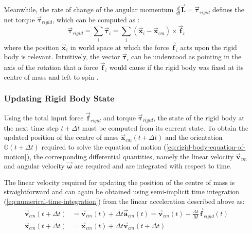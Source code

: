 \documentclass[oneside, a4paper]{book}
\newcommand\vek[1]{\vec{\bm{#1}}}
\newcommand\br[1]{\left(#1\right)}
\begin{document}
    Meanwhile, the rate of change of the angular momentum  $\frac{d}{dt}\vek{L}=\vek{\tau}_{rigid}$ defines the net torque $\vek{\tau}_{rigid}$, which can be computed as \autocite{physically-based-rigids}:
    \begin{equation}\label{eq:rigid-net-torque}
      \vek{\tau}_{rigid} = \sum_i \vek{\tau}_i = \sum_i (\vek{x}_i-\vek{x}_{cm}) \times \vek{f}_i
    \end{equation}
    where the position $\vek{x}_i$ in world space at which the force $\vek{f}_i$ acts upon the rigid body is relevant. Intuitively, the vector $\vek{\tau}_i$ can be understood as pointing in the axis of the rotation that a force $\vek{f}_i$ would cause if the rigid body was fixed at its centre of mass and left to spin \autocite{physically-based-rigids}.
    
    \subsubsection{Updating Rigid Body State}
    Using the total input force $\vek{f}_{rigid}$ and torque $\vek{\tau}_{rigid}$, the state of the rigid body at the next time step $t+\Delta t$ must be computed from its current state. To obtain the updated position of the centre of mass $\vek{x}_{cm}\br{t+\Delta t}$ and the orientation $\mathds{O}\br{t+\Delta t}$ required to solve the equation of motion (\autoref{eq:rigid-body-equation-of-motion}), the corresponding differential quantities, namely the linear velocity $\vek{v}_{cm}$ and angular velocity $\vek{\omega}$ are required and are integrated with respect to time. 

    The linear velocity required for updating the position of the centre of mass is straightforward and can again be obtained using semi-implicit time integration (\autoref{eq:numerical-time-integration}) from the linear acceleration described above as:
    \begin{align}
      \vek{v}_{cm}(t+\Delta t) &= \vek{v}_{cm}(t) + \Delta t \vek{a}_{cm}\br{t} = \vek{v}_{cm}(t) + \frac{\Delta t}{M} \vek{f}_{rigid}\br{t}\label{eq:rigid-vcm-update}\\
      \vek{x}_{cm}\br{t+\Delta t} &= \vek{x}_{cm}\br{t} + \Delta t \vek{v}_{cm}(t+\Delta t)\label{eq:rigid-xcm-update}
    \end{align}
\end{document}
